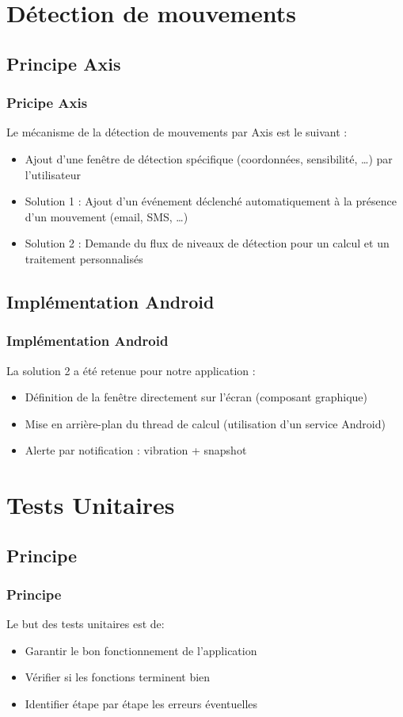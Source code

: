 \documentclass{beamer}
\begin{document}
\section{Détection de mouvements}
\subsection{Principe Axis}
 \begin{frame}
   \frametitle{Pricipe Axis}
    Le mécanisme de la détection de mouvements par Axis est le suivant :
   \begin{itemize}
    \item<2-> Ajout d'une fenêtre de détection spécifique (coordonnées,
    sensibilité, \ldots) par l'utilisateur
    \item<3-> Solution 1 : Ajout d'un événement déclenché automatiquement à la
    présence d'un mouvement (email, SMS, \ldots)
    \item<4-> Solution 2 : Demande du flux de niveaux de détection pour un
    calcul et un traitement personnalisés
   \end{itemize}
\end{frame}

\subsection{Implémentation Android}
 \begin{frame}
   \frametitle{Implémentation Android}
    La solution 2 a été retenue pour notre application :
    \begin{itemize}
    \item<2-> Définition de la fenêtre directement sur l'écran (composant
    graphique)
    \item<4-> Mise en arrière-plan du thread de calcul (utilisation d'un service
    Android)
    \item<5-> Alerte par notification : vibration + snapshot
   \end{itemize}
\end{frame}

\section{Tests Unitaires}
\subsection{Principe}
 \begin{frame}
   \frametitle{Principe}
Le but des tests unitaires est de:
\begin{itemize}
    \item<2-> Garantir le bon fonctionnement de l'application
    \item<3-> Vérifier si les fonctions terminent bien
    \item<4-> Identifier étape par étape les erreurs éventuelles
   \end{itemize}
\end{frame}
\end{document}

